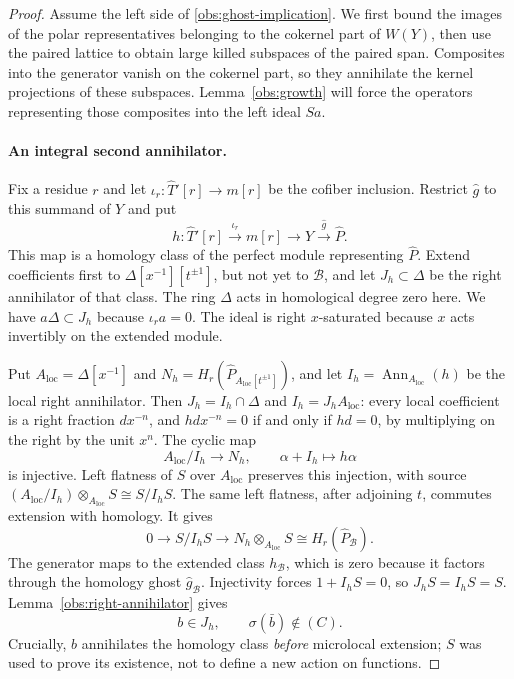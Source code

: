 \begin{proof}
Assume the left side of \eqref{obs:ghost-implication}.
We first bound the images of the polar representatives belonging
to the cokernel part of $W(Y)$, then use the paired lattice to
obtain large killed subspaces of the paired span.  Composites into
the generator vanish on the cokernel part, so they annihilate
the kernel projections of these subspaces.  Lemma~\ref{obs:growth}
will force the operators representing those composites into the
left ideal $Sa$.

\paragraph{An integral second annihilator.}
Fix a residue $r$ and let
$\iota_r:\widehat T'[r]\to m[r]$ be the cofiber inclusion.
Restrict $\widehat g$ to this summand of $Y$ and put
\[
 h:\widehat T'[r]\xrightarrow{\iota_r}m[r]
       \longrightarrow Y\xrightarrow{\widehat g}\widehat P.
\]
This map is a homology class of the perfect module representing
$\widehat P$.  Extend coefficients first to
$\Delta[x^{-1}][t^{\pm1}]$, but not yet to $\mathscr B$, and
let $J_h\subset\Delta$ be the right annihilator of that class.
The ring $\Delta$ acts in homological degree zero here.
We have $a\Delta\subset J_h$ because $\iota_r a=0$.
The ideal is right $x$-saturated because $x$ acts invertibly on
the extended module.

Put $A_{\mathrm{loc}}=\Delta[x^{-1}]$ and
$N_h=H_r(\widehat P_{A_{\mathrm{loc}}[t^{\pm1}]})$, and let
$I_h=\operatorname{Ann}_{A_{\mathrm{loc}}}(h)$ be the local right
annihilator.  Then $J_h=I_h\cap\Delta$ and
$I_h=J_hA_{\mathrm{loc}}$: every local coefficient is a right
fraction $d x^{-n}$, and $h d x^{-n}=0$ if and only if $h d=0$,
by multiplying on the right by the unit $x^n$.
The cyclic map
\[
 A_{\mathrm{loc}}/I_h\longrightarrow N_h,\qquad
 \alpha+I_h\longmapsto h\alpha
\]
is injective.  Left flatness of $S$ over $A_{\mathrm{loc}}$
preserves this injection, with source
$(A_{\mathrm{loc}}/I_h)\otimes_{A_{\mathrm{loc}}}S\cong S/I_hS$.
The same left flatness, after adjoining $t$, commutes extension
with homology.  It gives
\[
 0\longrightarrow S/I_hS
 \longrightarrow N_h\otimes_{A_{\mathrm{loc}}}S
 \cong H_r(\widehat P_{\mathscr B}).
\]
The generator maps to the extended class $h_{\mathscr B}$, which
is zero because it factors through the homology ghost
$\widehat g_{\mathscr B}$.  Injectivity forces $1+I_hS=0$, so
$J_hS=I_hS=S$.
Lemma~\ref{obs:right-annihilator} gives
\begin{equation}
\label{obs:second-annihilator}
 b\in J_h,\qquad \sigma(\bar b)\notin(C).
\end{equation}
Crucially, $b$ annihilates the homology class \emph{before}
microlocal extension; $S$ was used to prove its existence, not
to define a new action on functions.


\end{proof}
